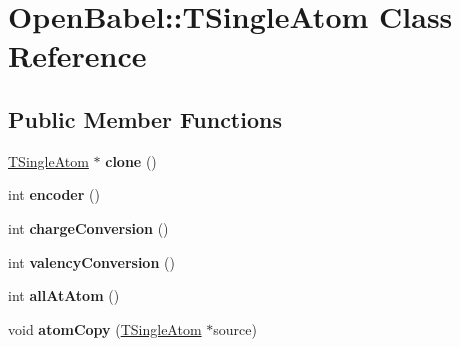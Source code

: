 \hypertarget{class_open_babel_1_1_t_single_atom}{\section{Open\-Babel\-:\-:T\-Single\-Atom Class Reference}
\label{class_open_babel_1_1_t_single_atom}
}
\subsection*{Public Member Functions}
\begin{DoxyCompactItemize}
\item 
\hypertarget{class_open_babel_1_1_t_single_atom_ae038f56ba9f3ce0410c25dece4927031}{\hyperlink{class_open_babel_1_1_t_single_atom}{T\-Single\-Atom} $\ast$ {\bfseries clone} ()}\label{class_open_babel_1_1_t_single_atom_ae038f56ba9f3ce0410c25dece4927031}

\item 
\hypertarget{class_open_babel_1_1_t_single_atom_af5d82764bf756ce17ac7d5c76c8b6f81}{int {\bfseries encoder} ()}\label{class_open_babel_1_1_t_single_atom_af5d82764bf756ce17ac7d5c76c8b6f81}

\item 
\hypertarget{class_open_babel_1_1_t_single_atom_aaa08934e96136a976c1ba8e29b7b2f14}{int {\bfseries charge\-Conversion} ()}\label{class_open_babel_1_1_t_single_atom_aaa08934e96136a976c1ba8e29b7b2f14}

\item 
\hypertarget{class_open_babel_1_1_t_single_atom_a6751ec87ef138a3cfdec1c8d3755ae8b}{int {\bfseries valency\-Conversion} ()}\label{class_open_babel_1_1_t_single_atom_a6751ec87ef138a3cfdec1c8d3755ae8b}

\item 
\hypertarget{class_open_babel_1_1_t_single_atom_ad490ab1cdc56f25666488c59d420c6dd}{int {\bfseries all\-At\-Atom} ()}\label{class_open_babel_1_1_t_single_atom_ad490ab1cdc56f25666488c59d420c6dd}

\item 
\hypertarget{class_open_babel_1_1_t_single_atom_a4a593cb243f0326942f9b5099cb9fe0b}{void {\bfseries atom\-Copy} (\hyperlink{class_open_babel_1_1_t_single_atom}{T\-Single\-Atom} $\ast$source)}\label{class_open_babel_1_1_t_single_atom_a4a593cb243f0326942f9b5099cb9fe0b}

\end{DoxyCompactItemize}
